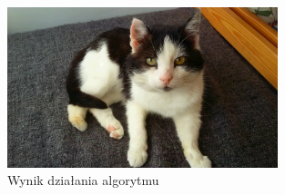 \documentclass[12pt,a4paper]{article}
\begin{document}
    \begin{figure}[!h]
        \centering
        \includegraphics[width=0.7\textwidth]{pieces/kot-z-wiadomosca}
        \caption{Wynik działania algorytmu} \label{fig:stegano-rezultat}
    \end{figure}
\end{document}
